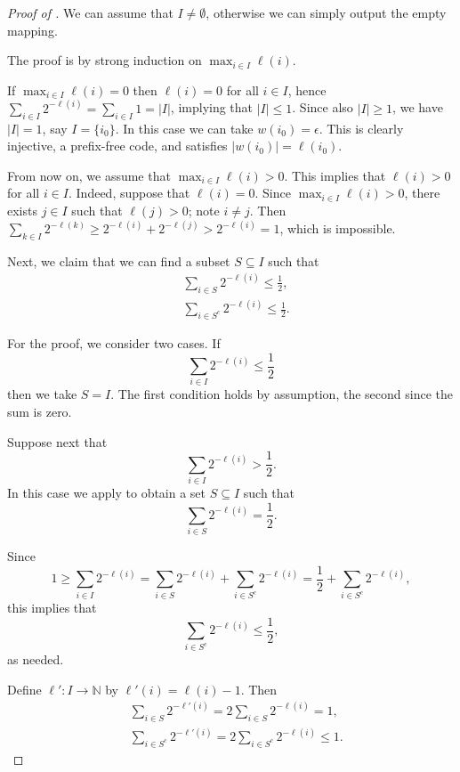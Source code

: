 \begin{proof}[Proof of ]
We can assume that $I \neq \emptyset$, otherwise we can simply output the empty mapping.

The proof is by strong induction on $\max_{i \in I} \ell(i)$.

If $\max_{i \in I} \ell(i) = 0$ then $\ell(i) = 0$ for all $i \in I$, hence $\sum_{i \in I} 2^{-\ell(i)} = \sum_{i \in I} 1 = |I|$, implying that $|I| \leq 1$. Since also $|I| \geq 1$, we have $|I| = 1$, say $I = \{i_0\}$. In this case we can take $w(i_0) = \epsilon$. This is clearly injective, a prefix-free code, and satisfies $|w(i_0)| = \ell(i_0)$.

From now on, we assume that $\max_{i \in I} \ell(i) > 0$. This implies that $\ell(i) > 0$ for all $i \in I$. Indeed, suppose that $\ell(i) = 0$. Since $\max_{i \in I} \ell(i) > 0$, there exists $j \in I$ such that $\ell(j) > 0$; note $i \neq j$. Then $\sum_{k \in I} 2^{-\ell(k)} \geq 2^{-\ell(i)} + 2^{-\ell(j)} > 2^{-\ell(i)} = 1$, which is impossible.

\smallskip

Next, we claim that we can find a subset $S \subseteq I$ such that
\begin{align*}
&\sum_{i \in S} 2^{-\ell(i)} \leq \frac{1}{2}, \\
&\sum_{i \in S^c} 2^{-\ell(i)} \leq \frac{1}{2}.
\end{align*}

For the proof, we consider two cases. If
\[
 \sum_{i \in I} 2^{-\ell(i)} \leq \frac{1}{2}
\]
then we take $S = I$. The first condition holds by assumption, the second since the sum is zero.

Suppose next that
\[
 \sum_{i \in I} 2^{-\ell(i)} > \frac{1}{2}.
\]
In this case we apply  to obtain a set $S \subseteq I$ such that
\[
 \sum_{i \in S} 2^{-\ell(i)} = \frac{1}{2}.
\]

Since
\[
 1 \geq \sum_{i \in I} 2^{-\ell(i)} = \sum_{i \in S} 2^{-\ell(i)} + \sum_{i \in S^c} 2^{-\ell(i)} = \frac{1}{2} + \sum_{i \in S^c} 2^{-\ell(i)},
\]
this implies that
\[
 \sum_{i \in S^c} 2^{-\ell(i)} \leq \frac{1}{2},
\]
as needed.

Define $\ell'\colon I \to \mathbb{N}$ by $\ell'(i) = \ell(i) - 1$. Then
\begin{align*}
&\sum_{i \in S} 2^{-\ell'(i)} =
2\sum_{i \in S} 2^{-\ell(i)} = 1, \\
&\sum_{i \in S^c} 2^{-\ell'(i)} = 2\sum_{i \in S^c} 2^{-\ell(i)} \leq 1.
\end{align*}


\end{proof}
